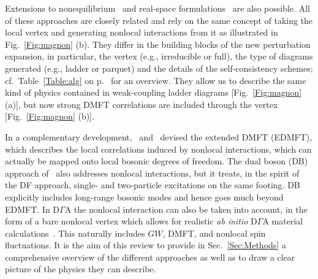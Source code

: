 \documentclass[rmp,aps,reprint,amsmath,amssymb,superscriptaddress,showpacs,nofootinbib]{revtex4-1}
\begin{document}
Extensions to nonequilibrium~\cite{Munoz2013} and real-space formulations~\cite{Valli2010,Takemori2016} are also possible. All of these approaches are closely related and rely on the same concept of tak\-ing the local vertex and generating nonlocal interactions from it as illustrated in Fig.~\ref{Fig:magnon} (b). They differ in the building blocks of the new perturbation expansion, in particular, the vertex (e.g., irreducible or full), the type of diagrams generated (e.g., ladder or parquet) and the details of the self-consistency schemes; cf.\  Table~\ref{Table:alg} on p.~\pageref{Table:alg} for an overview. They allow us to describe the same kind of physics contained in weak-coupling ladder diagrams [Fig.~\ref{Fig:magnon} (a)], but now  strong DMFT correlations are included through the vertex [Fig.~\ref{Fig:magnon} (b)].

In a complementary development,~ and~ devised the extended DMFT (EDMFT), which describes the local correlations induced by nonlocal interactions, which can actually be mapped onto local bosonic degrees of freedom. The dual boson (DB) approach of~ also addresses nonlocal interactions, but it treats, in the spirit of the DF approach,  single- and two-particle excitations on the same footing. DB explicitly includes long-range bosonic modes and hence goes much beyond EDMFT. In D$\Gamma$A the nonlocal interaction can also be taken into account, in the form of a bare nonlocal vertex which allows for realistic \emph{ab initio} D$\Gamma$A material calculations~\cite{Toschi2011,Galler2016}. This naturally includes $GW$, DMFT, and nonlocal spin fluctuations. It is the aim of this review to provide in Sec.~\ref{Sec:Methods} a comprehensive overview of the different approaches as well as to draw a clear picture of the physics they can describe.
\end{document}
